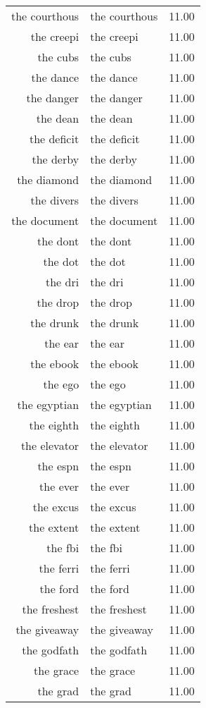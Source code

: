\begin{table}[ht]
\begin{tabular}{rlr}
  the courthous & the courthous & 11.00 \\ 
  the creepi & the creepi & 11.00 \\ 
  the cubs & the cubs & 11.00 \\ 
  the dance & the dance & 11.00 \\ 
  the danger & the danger & 11.00 \\ 
  the dean & the dean & 11.00 \\ 
  the deficit & the deficit & 11.00 \\ 
  the derby & the derby & 11.00 \\ 
  the diamond & the diamond & 11.00 \\ 
  the divers & the divers & 11.00 \\ 
  the document & the document & 11.00 \\ 
  the dont & the dont & 11.00 \\ 
  the dot & the dot & 11.00 \\ 
  the dri & the dri & 11.00 \\ 
  the drop & the drop & 11.00 \\ 
  the drunk & the drunk & 11.00 \\ 
  the ear & the ear & 11.00 \\ 
  the ebook & the ebook & 11.00 \\ 
  the ego & the ego & 11.00 \\ 
  the egyptian & the egyptian & 11.00 \\ 
  the eighth & the eighth & 11.00 \\ 
  the elevator & the elevator & 11.00 \\ 
  the espn & the espn & 11.00 \\ 
  the ever & the ever & 11.00 \\ 
  the excus & the excus & 11.00 \\ 
  the extent & the extent & 11.00 \\ 
  the fbi & the fbi & 11.00 \\ 
  the ferri & the ferri & 11.00 \\ 
  the ford & the ford & 11.00 \\ 
  the freshest & the freshest & 11.00 \\ 
  the giveaway & the giveaway & 11.00 \\ 
  the godfath & the godfath & 11.00 \\ 
  the grace & the grace & 11.00 \\ 
  the grad & the grad & 11.00 \\ 

\end{tabular}
\end{table}
